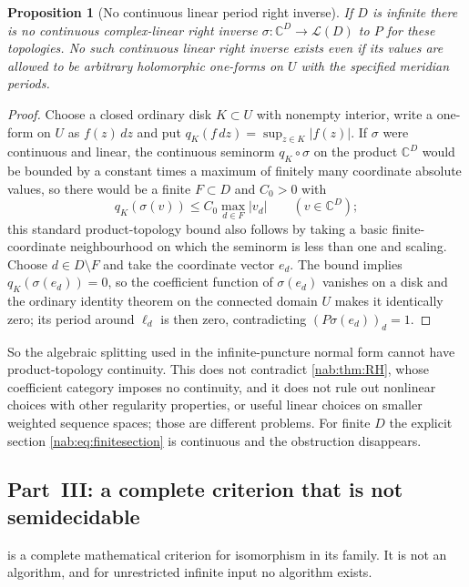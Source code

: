 \documentclass[11pt,letterpaper]{article}
\newtheorem{proposition}[proposition]{Proposition}
\theoremstyle{definition}
\theoremstyle{remark}
\newcommand{\C}{\mathbb C}
\newcommand{\LL}{\mathcal L}
\numberwithin{equation}{section}
\begin{document}
\begin{proposition}[No continuous linear period right inverse]
\label{nab:prop:discontinuous}
If $D$ is infinite there is no continuous complex-linear right inverse
$\sigma:\C^D\to\LL(D)$ to $P$ for these topologies. No such continuous linear
right inverse exists even if its values are allowed to be arbitrary
holomorphic one-forms on $U$ with the specified meridian periods.
\end{proposition}

\begin{proof}
Choose a closed ordinary disk $K\subset U$ with nonempty interior, write a
one-form on $U$ as $f(z)\,dz$ and put $q_K(f\,dz)=\sup_{z\in K}|f(z)|$. If
$\sigma$ were continuous and linear, the continuous seminorm $q_K\circ\sigma$
on the product $\C^D$ would be bounded by a constant times a maximum of
finitely many coordinate absolute values, so there would be a finite
$F\subset D$ and $C_0>0$ with
\[
 q_K(\sigma(v))\leq C_0\max_{d\in F}|v_d|\qquad(v\in\C^D);
\]
this standard product-topology bound also follows by taking a basic
finite-coordinate neighbourhood on which the seminorm is less than one and
scaling. Choose $d\in D\setminus F$ and take the coordinate vector $e_d$. The
bound implies $q_K(\sigma(e_d))=0$, so the coefficient function of
$\sigma(e_d)$ vanishes on a disk and the ordinary identity theorem on the
connected domain $U$ makes it identically zero; its period around $\ell_d$ is
then zero, contradicting $(P\sigma(e_d))_d=1$.
\end{proof}

So the algebraic splitting used in the infinite-puncture normal form cannot
have product-topology continuity. This does not contradict
\cref{nab:thm:RH}, whose coefficient category imposes no continuity, and it
does not rule out nonlinear choices with other regularity properties, or useful
linear choices on smaller weighted sequence spaces; those are different
problems. For finite $D$ the explicit section \eqref{nab:eq:finitesection} is
continuous and the obstruction disappears.

\subsection{Part~III: a complete criterion that is not semidecidable}
\label{nab:loc:sub:effectivity}

 is a complete mathematical criterion for
isomorphism in its family. It is not an algorithm, and for unrestricted
infinite input no algorithm exists.
\end{document}
